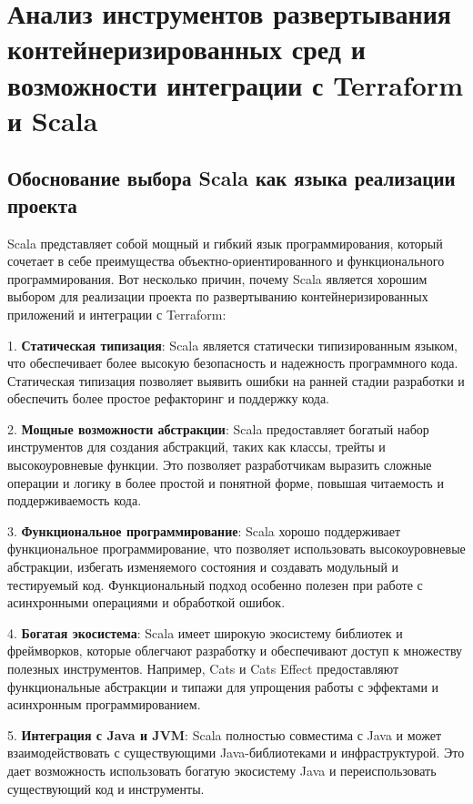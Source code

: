 \chapter{Анализ инструментов развертывания контейнеризированных
сред и возможности интеграции с Terraform и Scala}
\label{chapter1}

\section{Обоснование выбора Scala как языка реализации проекта}

Scala представляет собой мощный и гибкий язык программирования, который сочетает
в себе преимущества объектно-ориентированного и функционального
программирования. Вот несколько причин, почему Scala является хорошим выбором
для реализации проекта по развертыванию контейнеризированных приложений и
интеграции с Terraform:

1. \textbf{Статическая типизация}: Scala является статически типизированным
языком, что обеспечивает более высокую безопасность и надежность
программного кода. Статическая типизация позволяет выявить ошибки
на ранней стадии разработки и обеспечить более простое рефакторинг
и поддержку кода.\cite{pierce-types-2012-ru}

2. \textbf{Мощные возможности абстракции}: Scala предоставляет богатый
набор инструментов для создания абстракций, таких как классы,
трейты и высокоуровневые функции. Это позволяет разработчикам
выразить сложные операции и логику в более простой и понятной форме,
повышая читаемость и поддерживаемость кода.\cite{moors2008safe}

3. \textbf{Функциональное программирование}: Scala хорошо поддерживает
функциональное программирование, что позволяет использовать
высокоуровневые абстракции, избегать изменяемого состояния и
создавать модульный и тестируемый код. Функциональный подход
особенно полезен при работе с асинхронными операциями и обработкой ошибок.

4. \textbf{Богатая экосистема}: Scala имеет широкую экосистему библиотек
и фреймворков, которые облегчают разработку и обеспечивают доступ
к множеству полезных инструментов. Например, Cats и Cats Effect
предоставляют функциональные абстракции и типажи для упрощения
работы с эффектами и асинхронным программированием.
\cite{cats-effect, cats}

5. \textbf{Интеграция с Java и JVM}: Scala полностью совместима с Java
и может взаимодействовать с существующими Java-библиотеками и
инфраструктурой. Это дает возможность использовать богатую экосистему
Java и переиспользовать существующий код и инструменты.

